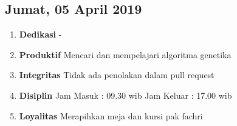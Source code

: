 \subsection{Jumat, 05 April 2019}
\begin{enumerate}
\item \textbf{Dedikasi}
\subitem -
\item \textbf{Produktif}
\subitem Mencari dan mempelajari algoritma genetika
\item \textbf{Integritas}
\subitem Tidak ada penolakan dalam pull request
\item \textbf{Disiplin}
\subitem Jam Masuk : 09.30 wib
\subitem Jam Keluar : 17.00 wib
\item \textbf{Loyalitas}
\subitem Merapihkan meja dan kursi pak fachri
\end{enumerate}

